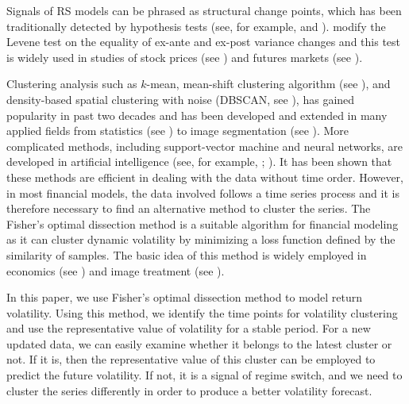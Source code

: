 \documentclass[preprint,12pt,authoryear]{elsarticle}
\begin{document}
	Signals of RS models can be phrased as structural change points, which has been traditionally detected
	by hypothesis tests (see, for example, \cite{Andreou2002} and \cite{Lee2015}).
	\cite{Brown1974}
	modify the Levene test on the equality of ex-ante and ex-post variance changes and this test is widely
	used in studies of stock prices (see \cite{Riordan2012}) and futures markets (see \cite{Ederington1993}).
	
	Clustering analysis such as $k$-mean, mean-shift clustering algorithm (see \cite{Cheng1995}), and density-based spatial clustering with noise (DBSCAN, see \cite{Ester1996}), has gained popularity in past two decades and has been developed and extended in many applied fields from statistics (see \cite{Jain1999}) to image segmentation (see \cite{Coleman1979}). More complicated methods, including support-vector machine and neural networks, are developed in artificial intelligence (see, for example, \cite{Zhang2000};  \cite{Shi2016}). It has been shown that these methods are efficient in dealing with the data without time order. However, in most financial models, the data involved follows a time series process and it is therefore necessary to find an alternative method to cluster the series. The Fisher's optimal dissection method is a suitable algorithm for financial modeling as it can cluster dynamic volatility by minimizing a loss function defined by the similarity of samples. The basic idea of this method is widely employed in economics (see \cite{Bai2003}) and image treatment (see \cite{Verbesselt2010}).
	
	In this paper, we use Fisher's optimal dissection method to model return volatility. Using this method, we identify the time points for volatility clustering and use the representative value of volatility for a stable period. For a new updated data, we can easily examine whether it belongs to the latest cluster or not. If it is, then the representative value of this cluster can be employed to predict the future volatility. If not, it is a signal of regime switch, and we need to cluster the series differently in order to produce a better volatility forecast.
\end{document}

